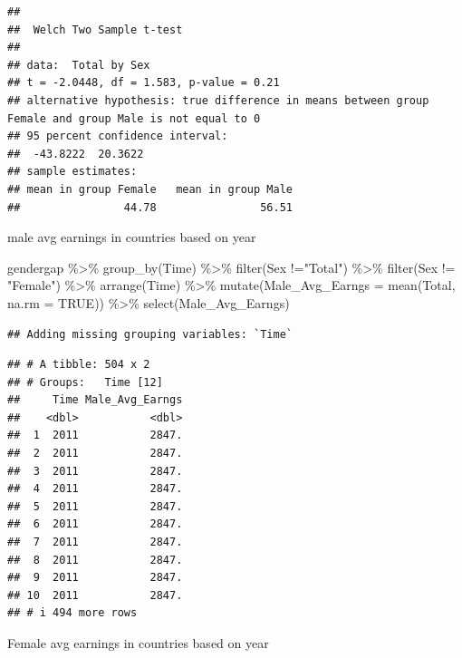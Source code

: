 \documentclass[
]{article}
\newenvironment{Shaded}{\begin{snugshade}}{\end{snugshade}}
\newcommand{\AttributeTok}[1]{\textcolor[rgb]{0.77,0.63,0.00}{#1}}
\newcommand{\ConstantTok}[1]{\textcolor[rgb]{0.00,0.00,0.00}{#1}}
\newcommand{\FunctionTok}[1]{\textcolor[rgb]{0.00,0.00,0.00}{#1}}
\newcommand{\NormalTok}[1]{#1}
\newcommand{\SpecialCharTok}[1]{\textcolor[rgb]{0.00,0.00,0.00}{#1}}
\newcommand{\StringTok}[1]{\textcolor[rgb]{0.31,0.60,0.02}{#1}}
\begin{document}
\begin{verbatim}
## 
##  Welch Two Sample t-test
## 
## data:  Total by Sex
## t = -2.0448, df = 1.583, p-value = 0.21
## alternative hypothesis: true difference in means between group Female and group Male is not equal to 0
## 95 percent confidence interval:
##  -43.8222  20.3622
## sample estimates:
## mean in group Female   mean in group Male 
##                44.78                56.51
\end{verbatim}

male avg earnings in countries based on year

\begin{Shaded}
\begin{Highlighting}[]
\NormalTok{gendergap }\SpecialCharTok{\%\textgreater{}\%}
  \FunctionTok{group\_by}\NormalTok{(Time) }\SpecialCharTok{\%\textgreater{}\%}
  \FunctionTok{filter}\NormalTok{(Sex }\SpecialCharTok{!=}\StringTok{"Total"}\NormalTok{) }\SpecialCharTok{\%\textgreater{}\%}
  \FunctionTok{filter}\NormalTok{(Sex }\SpecialCharTok{!=} \StringTok{"Female"}\NormalTok{) }\SpecialCharTok{\%\textgreater{}\%}
  \FunctionTok{arrange}\NormalTok{(Time) }\SpecialCharTok{\%\textgreater{}\%}
  \FunctionTok{mutate}\NormalTok{(}\AttributeTok{Male\_Avg\_Earngs =} \FunctionTok{mean}\NormalTok{(Total, }\AttributeTok{na.rm =} \ConstantTok{TRUE}\NormalTok{)) }\SpecialCharTok{\%\textgreater{}\%}
  \FunctionTok{select}\NormalTok{(Male\_Avg\_Earngs)}
\end{Highlighting}
\end{Shaded}

\begin{verbatim}
## Adding missing grouping variables: `Time`
\end{verbatim}

\begin{verbatim}
## # A tibble: 504 x 2
## # Groups:   Time [12]
##     Time Male_Avg_Earngs
##    <dbl>           <dbl>
##  1  2011           2847.
##  2  2011           2847.
##  3  2011           2847.
##  4  2011           2847.
##  5  2011           2847.
##  6  2011           2847.
##  7  2011           2847.
##  8  2011           2847.
##  9  2011           2847.
## 10  2011           2847.
## # i 494 more rows
\end{verbatim}

Female avg earnings in countries based on year
\end{document}
